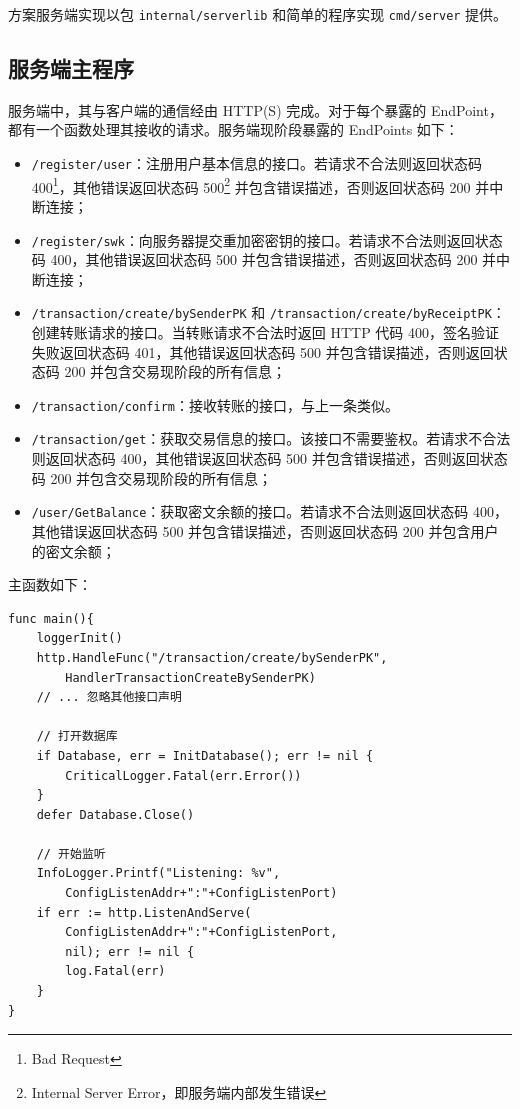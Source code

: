 方案服务端实现以包 \verb|internal/serverlib| 和简单的程序实现 \verb|cmd/server| 提供。

\subsection{服务端主程序}

服务端中，其与客户端的通信经由 HTTP(S) 完成。对于每个暴露的 EndPoint，都有一个函数处理其接收的请求。服务端现阶段暴露的 EndPoints 如下：

\begin{itemize}
    \item \verb|/register/user|：注册用户基本信息的接口。若请求不合法则返回状态码 400\footnote{Bad Request}，其他错误返回状态码 500\footnote{Internal Server Error，即服务端内部发生错误} 并包含错误描述，否则返回状态码 200 并中断连接；
    \item \verb|/register/swk|：向服务器提交重加密密钥的接口。若请求不合法则返回状态码 400，其他错误返回状态码 500 并包含错误描述，否则返回状态码 200 并中断连接；
    \item \verb|/transaction/create/bySenderPK| 和 \verb|/transaction/create/byReceiptPK|：创建转账请求的接口。当转账请求不合法时返回 HTTP 代码 400，签名验证失败返回状态码 401，其他错误返回状态码 500 并包含错误描述，否则返回状态码 200 并包含交易现阶段的所有信息；
    \item \verb|/transaction/confirm|：接收转账的接口，与上一条类似。
    \item \verb|/transaction/get|：获取交易信息的接口。该接口不需要鉴权。若请求不合法则返回状态码 400，其他错误返回状态码 500 并包含错误描述，否则返回状态码 200 并包含交易现阶段的所有信息；
    \item \verb|/user/GetBalance|：获取密文余额的接口。若请求不合法则返回状态码 400，其他错误返回状态码 500 并包含错误描述，否则返回状态码 200 并包含用户的密文余额；
\end{itemize}

主函数如下：

\begin{verbatim}
func main(){
    loggerInit()
    http.HandleFunc("/transaction/create/bySenderPK", 
        HandlerTransactionCreateBySenderPK)
    // ... 忽略其他接口声明
    
    // 打开数据库
    if Database, err = InitDatabase(); err != nil {
        CriticalLogger.Fatal(err.Error())
    }
    defer Database.Close()

    // 开始监听
    InfoLogger.Printf("Listening: %v", 
        ConfigListenAddr+":"+ConfigListenPort)
    if err := http.ListenAndServe(
        ConfigListenAddr+":"+ConfigListenPort,
        nil); err != nil {
        log.Fatal(err)
    }
}
\end{verbatim}

